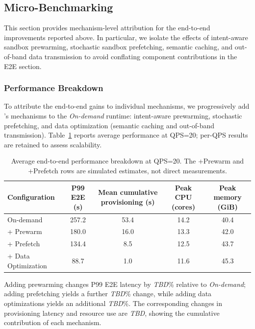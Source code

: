 \subsection{Micro-Benchmarking}
\label{sec:exp:ablation}

This section provides mechanism-level attribution for the end-to-end improvements reported above. In particular, we isolate the effects of intent-aware sandbox prewarming, stochastic sandbox prefetching, semantic caching, and out-of-band data transmission to avoid conflating component contributions in the E2E section.

\subsubsection{Performance Breakdown}
\label{sec:exp:performance_breakdown}

To attribute the end-to-end gains to individual mechanisms, we progressively add \SystemName's mechanisms to the \textit{On-demand} runtime: intent-aware prewarming, stochastic prefetching, and data optimization (semantic caching and out-of-band transmission). Table~\ref{tab:performance_breakdown} reports average performance at QPS=20; per-QPS results are retained to assess scalability.

\begin{table}[t]
\caption{Average end-to-end performance breakdown at QPS=20. The +Prewarm and +Prefetch rows are simulated estimates, not direct measurements.}
\label{tab:performance_breakdown}
\centering
\small
\begin{tabular}{lcccc}
\toprule
Configuration & P99 E2E (s) & Mean cumulative provisioning (s) & Peak CPU (cores) & Peak memory (GiB) \\
\midrule
On-demand & 257.2 & 53.4 & 14.2 & 40.4 \\
+ Prewarm & 180.0 & 16.0 & 13.3 & 42.0 \\
+ Prefetch & 134.4 & 8.5 & 12.5 & 43.7 \\
+ Data Optimization & 88.7 & 1.0 & 11.6 & 45.3 \\
\bottomrule
\end{tabular}
\vspace{-4mm}
\end{table}

Adding prewarming changes P99 E2E latency by \textit{TBD}\% relative to \textit{On-demand}; adding prefetching yields a further \textit{TBD}\% change, while adding data optimizations yields an additional \textit{TBD}\%. The corresponding changes in provisioning latency and resource use are \textit{TBD}, showing the cumulative contribution of each mechanism.

